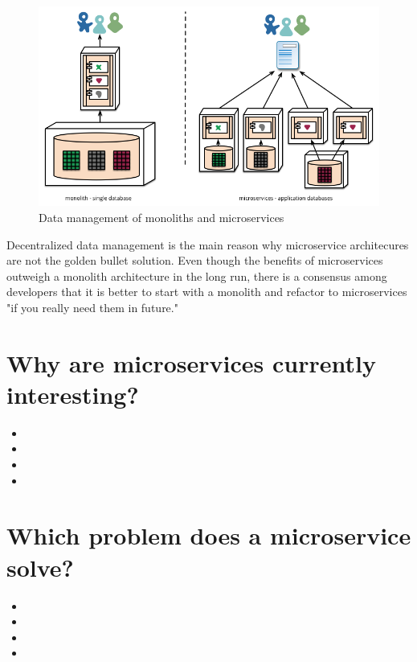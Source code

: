 \begin{figure}[ht]
  \centering
  \includegraphics[width=0.7\linewidth]{assets/decentralised-data.png}
  \caption{Data management of monoliths and microservices}
  \label{fig:decentralised-data}
\end{figure}

Decentralized data management is the main reason why microservice architecures are not the golden bullet solution. Even though the benefits of microservices outweigh a monolith architecture in the long run, there is a consensus among developers that it is better to start with a monolith and refactor to microservices "if you really need them in future." ~\cite{krivtsov.2019}


\section{Why are microservices currently interesting?}

\begin{itemize}
  \item {}
  \item {}
  \item {}
  \item {}
\end{itemize}


\section{Which problem does a microservice solve?}
\label{sec:theory:what-problem}

\begin{itemize}
  \item {}
  \item {}
  \item {}
  \item {}
\end{itemize}


